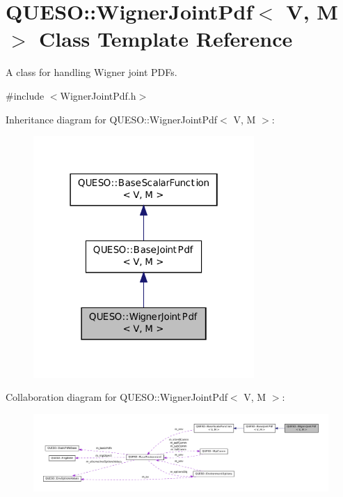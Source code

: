 \hypertarget{class_q_u_e_s_o_1_1_wigner_joint_pdf}{\section{Q\-U\-E\-S\-O\-:\-:Wigner\-Joint\-Pdf$<$ V, M $>$ Class Template Reference}
\label{class_q_u_e_s_o_1_1_wigner_joint_pdf}
}


A class for handling Wigner joint P\-D\-Fs.  




{\ttfamily \#include $<$Wigner\-Joint\-Pdf.\-h$>$}



Inheritance diagram for Q\-U\-E\-S\-O\-:\-:Wigner\-Joint\-Pdf$<$ V, M $>$\-:
\nopagebreak
\begin{figure}[H]
\begin{center}
\leavevmode
\includegraphics[width=238pt]{class_q_u_e_s_o_1_1_wigner_joint_pdf__inherit__graph}
\end{center}
\end{figure}


Collaboration diagram for Q\-U\-E\-S\-O\-:\-:Wigner\-Joint\-Pdf$<$ V, M $>$\-:
\nopagebreak
\begin{figure}[H]
\begin{center}
\leavevmode
\includegraphics[width=350pt]{class_q_u_e_s_o_1_1_wigner_joint_pdf__coll__graph}
\end{center}
\end{figure}
